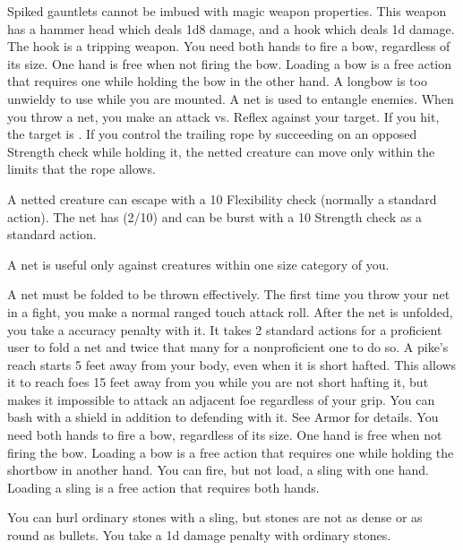          Spiked gauntlets cannot be imbued with magic weapon properties.
         This weapon has a hammer head which deals 1d8 damage, and a hook which deals \minus1d damage. The hook is a tripping weapon.
         You need both hands to fire a bow, regardless of its size. One hand is free when not firing the bow. Loading a bow is a free action that requires one  while holding the bow in the other hand. A longbow is too unwieldy to use while you are mounted.
         A net is used to entangle enemies. When you throw a net, you make an attack vs. Reflex against your target. If you hit, the target is \slowed. If you control the trailing rope by succeeding on an opposed Strength check while holding it, the netted creature can move only within the limits that the rope allows.
        \par A netted creature can escape with a  10 Flexibility check (normally a standard action). The net has (2/10) and can be burst with a  10 Strength check as a standard action.
        \par A net is useful only against creatures within one size category of you.
        \par A net must be folded to be thrown effectively. The first time you throw your net in a fight, you make a normal ranged touch attack roll. After the net is unfolded, you take a  accuracy penalty with it. It takes 2 standard actions for a proficient user to fold a net and twice that many for a nonproficient one to do so.
         A pike's reach starts 5 feet away from your body, even when it is short hafted.
        This allows it to reach foes 15 feet away from you while you are not short hafting it, but makes it impossible to attack an adjacent foe regardless of your grip.
         You can bash with a shield in addition to defending with it. See Armor for details.
         You need both hands to fire a bow, regardless of its size. One hand is free when not firing the bow. Loading a bow is a free action that requires one  while holding the shortbow in another hand.
         You can fire, but not load, a sling with one hand. Loading a sling is a free action that requires both hands.
        \par You can hurl ordinary stones with a sling, but stones are not as dense or as round as bullets. You take a \minus1d damage penalty with ordinary stones.
